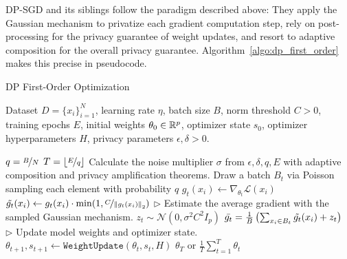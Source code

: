 DP-SGD and its siblings follow the paradigm described above: They apply the Gaussian mechanism to privatize each gradient computation step, rely on post-processing for the privacy guarantee of weight updates, and resort to adaptive composition for the overall privacy guarantee. 
Algorithm~\ref{algo:dp_first_order} makes this precise in pseudocode.
\begin{algorithm}[H]
\centering
\caption{DP First-Order Optimization}
\begin{algorithmic}[1]
  Dataset $D=\{x_i\}_{i=1}^N$, learning rate $\eta$, batch size $B$, norm threshold $C > 0$, training epochs $E$, initial weights $\theta_0\in\mathbb{R}^p$, optimizer state $s_0$, optimizer hyperparameters $H$, privacy parameters $\epsilon, \delta > 0$.

  \State $q = \nicefrac{B}{N}$ 
  \State $T = \lfloor  \nicefrac{E}{q}  \rfloor$ 
  \State Calculate the noise multiplier $\sigma$ from $\epsilon, \delta, q, E$ with adaptive composition and privacy amplification theorems.
    \State Draw a batch $B_t$ via Poisson sampling each element with probability $q$
        \State $g_t(x_i) \gets \nabla_{\theta_t} \mathcal{L}(x_i)$ 
        \State $\tilde{g_t}(x_i) \gets g_t(x_i) \cdot \min(1, \nicefrac{C}{ \left\lVert g_t(x_i)\right\rVert_2 })$ 
    \EndFor
    \State \(\triangleright\) {\color{red} Estimate the average gradient with the sampled Gaussian mechanism.} 
    \State $z_t \sim \mathcal{N}(0, \sigma^2 C^2 I_p)$
    \State $\bar{g_t} = \frac{1}{B} \left( 
        \sum_{x_i \in B_t} \tilde{g_t}(x_i) + z_t
    \right)$
    \State \(\triangleright\) {\color{red} Update model weights and optimizer state.}
    \State $\theta_{t + 1}, s_{t+1} \gets \texttt{WeightUpdate}(\theta_t, s_t, H)$
    \EndFor
\State \Return $\theta_{T}$ or $\frac{1}{T}\sum_{t=1}^T \theta_t$
\end{algorithmic}
\label{algo:dp_first_order}
\end{algorithm}


